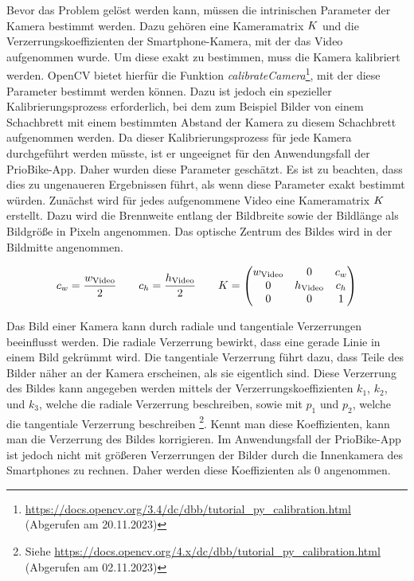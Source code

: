 Bevor das Problem gelöst werden kann, müssen die intrinischen Parameter der Kamera bestimmt werden. Dazu gehören eine Kameramatrix $K$ und die Verzerrungskoeffizienten der Smartphone-Kamera, mit der das Video aufgenommen wurde. Um diese exakt zu bestimmen, muss die Kamera kalibriert werden. OpenCV bietet hierfür die Funktion \textit{calibrateCamera}\footnote{\url{https://docs.opencv.org/3.4/dc/dbb/tutorial_py_calibration.html} (Abgerufen am 20.11.2023)}, mit der diese Parameter bestimmt werden können. Dazu ist jedoch ein spezieller Kalibrierungsprozess erforderlich, bei dem zum Beispiel Bilder von einem Schachbrett mit einem bestimmten Abstand der Kamera zu diesem Schachbrett aufgenommen werden. Da dieser Kalibrierungsprozess für jede Kamera durchgeführt werden müsste, ist er ungeeignet für den Anwendungsfall der PrioBike-App. Daher wurden diese Parameter geschätzt. Es ist zu beachten, dass dies zu ungenaueren Ergebnissen führt, als wenn diese Parameter exakt bestimmt würden. Zunächst wird für jedes aufgenommene Video eine Kameramatrix $K$ erstellt. Dazu wird die Brennweite entlang der Bildbreite sowie der Bildlänge als Bildgröße in Pixeln angenommen. Das optische Zentrum des Bildes wird in der Bildmitte angenommen.

\[
c_w = \frac{w_{\text{Video}}}{2} \qquad
c_h = \frac{h_{\text{Video}}}{2} \qquad  
K = \begin{pmatrix}
w_{\text{Video}} & 0 & c_w \\
0 & h_{\text{Video}} & c_h \\
0 & 0 & 1\\
\end{pmatrix}
\]

Das Bild einer Kamera kann durch radiale und tangentiale Verzerrungen beeinflusst werden. Die radiale Verzerrung bewirkt, dass eine gerade Linie in einem Bild gekrümmt wird. Die tangentiale Verzerrung führt dazu, dass Teile des Bilder näher an der Kamera erscheinen, als sie eigentlich sind. Diese Verzerrung des Bildes kann angegeben werden mittels der Verzerrungskoeffizienten $k_1$, $k_2$, und $k_3$, welche die radiale Verzerrung beschreiben, sowie mit $p_1$ und $p_2$, welche die tangentiale Verzerrung beschreiben \footnote{Siehe \url{https://docs.opencv.org/4.x/dc/dbb/tutorial_py_calibration.html} (Abgerufen am 02.11.2023)}. Kennt man diese Koeffizienten, kann man die Verzerrung des Bildes korrigieren. Im Anwendungsfall der PrioBike-App ist jedoch nicht mit größeren Verzerrungen der Bilder durch die Innenkamera des Smartphones zu rechnen. Daher werden diese Koeffizienten als 0 angenommen.

